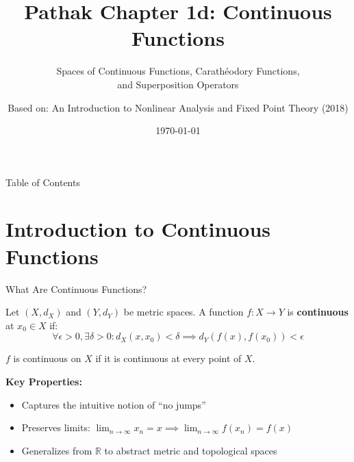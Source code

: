 \documentclass[aspectratio=169,10pt]{beamer}
\title[Continuous Functions]{Pathak Chapter 1d: Continuous Functions}
\subtitle{Spaces of Continuous Functions, Carathéodory Functions, \\ and Superposition Operators}
\author{Based on: An Introduction to Nonlinear Analysis and Fixed Point Theory (2018)}
\date{\today}
\begin{document}
\begin{frame}
    \titlepage
\end{frame}

\begin{frame}{Table of Contents}
    \tableofcontents
\end{frame}

\section{Introduction to Continuous Functions}

\begin{frame}{What Are Continuous Functions?}
    \begin{definition}
        Let $(X, d_X)$ and $(Y, d_Y)$ be metric spaces. A function $f: X \to Y$ is \textbf{continuous} at $x_0 \in X$ if:
        \[
            \forall \epsilon > 0, \exists \delta > 0: d_X(x, x_0) < \delta \implies d_Y(f(x), f(x_0)) < \epsilon
        \]

        $f$ is continuous on $X$ if it is continuous at every point of $X$.
    \end{definition}

    \vspace{0.3cm}
    \textbf{Key Properties:}
    \begin{itemize}
        \item Captures the intuitive notion of ``no jumps''
        \item Preserves limits: $\lim_{n \to \infty} x_n = x \implies \lim_{n \to \infty} f(x_n) = f(x)$
        \item Generalizes from $\mathbb{R}$ to abstract metric and topological spaces
    \end{itemize}
\end{frame}
\end{document}
